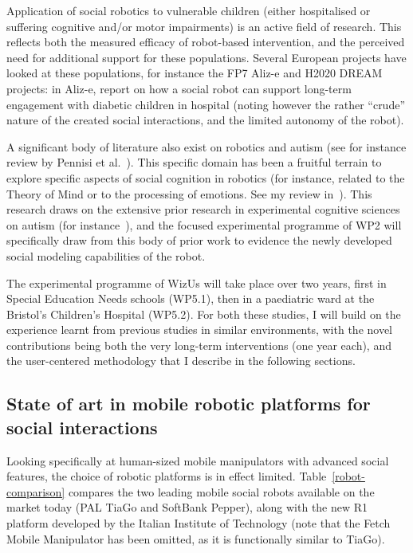 \documentclass[11pt,a4paper]{report}
\newcommand{\project}{WizUs\xspace}
\begin{document}
Application of social robotics to vulnerable children (either hospitalised or
suffering cognitive and/or motor impairments) is an active field of research.
This reflects both the measured efficacy of robot-based intervention, and the
perceived need for additional support for these populations.  Several European
projects have looked at these populations, for instance the FP7 Aliz-e and H2020
DREAM projects: in Aliz-e, \cite{baxter2011long,coninx2016towards} report on how
a social robot can support long-term engagement with diabetic children in
hospital (noting however the rather ``crude'' nature of the created social
interactions, and the limited autonomy of the robot).

A significant body of literature also exist on robotics and autism (see for
instance review by Pennisi et al.~\cite{pennisi2016autism}). This specific
domain has been a fruitful terrain to explore specific aspects of social
cognition in robotics (for instance, related to the Theory of Mind or to the
processing of emotions. See my review in~\cite{lemaignan2015mutual}). This
research draws on the extensive prior research in experimental cognitive
sciences on autism (for instance~\cite{baron1985does, frith1994autism}), and the
focused experimental programme of WP2 will specifically draw from this body of
prior work to evidence the newly developed social modeling capabilities of the
robot.

The experimental programme of \project will take place over two years, first in
Special Education Needs schools (WP5.1), then in a paediatric ward at the
Bristol's Children's Hospital (WP5.2). For both these studies, I will build on
the experience learnt from previous studies in similar environments, with the
novel contributions being both the very long-term interventions (one year each),
and the user-centered methodology that I describe in the following sections.


\subsection{State of art in mobile robotic platforms for social interactions}

Looking specifically at human-sized mobile manipulators with advanced social
features, the choice of robotic platforms is in effect limited.
Table~\ref{robot-comparison} compares the two leading mobile social robots
available on the market today (PAL TiaGo and SoftBank Pepper), along with the
new R1 platform developed by the Italian Institute of Technology (note that the
Fetch Mobile Manipulator has been omitted, as it is functionally similar to
TiaGo).
\end{document}
